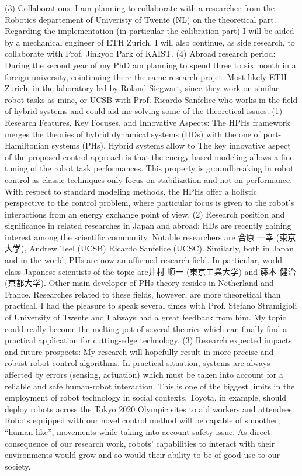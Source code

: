 (3) Collaborations: 
I am planning to collaborate with a researcher from the Robotics departement of Univeristy of Twente (NL) on the theoretical part. Regarding the implementation (in particular the calibration part) I will be aided by a mechanical engineer of ETH Zurich. I will also continue, as side research, to collaborate with Prof. Jinkyoo Park of KAIST.
(4) Abroad research period: 
During the second year of my PhD am planning to spend three to six month in a foreign university, cointinuing there the same research projet. Most likely ETH Zurich, in the laboratory led by Roland Siegwart, since they work on similar robot tasks as mine, or UCSB with Prof. Ricardo Sanfelice who works in the field of hybrid systems and could aid me solving some of the theoretical issues.
(1) Research Features, Key Focuses, and Innovative Aspects: The HPHs framework merges the theories of hybrid dynamical systems (HDs) with the one of port-Hamiltonian systems (PHs). Hybrid systems allow to The key innovative aspect of the proposed control approach is that the energy-based modeling allows a fine tuning of the robot task performances. This property is groundbreaking in robot control as classic techniques only focus on stabilization and not on performance. With respect to standard modeling methods, the HPHs offer a holistic perspective to the control problem, where particular focus is given to the robot’s interactions from an energy exchange point of view. 
(2) Research position and significance in related researches in Japan and abroad: HDs are recently gaining interest among the scientific community. Notable researchers are 合原 一幸 (東京大学), Andrew Teel (UCSB) Ricardo Sanfelice (UCSC). Similarly, both in Japan and in the world, PHs are now an affirmed research field. In particular, world-class Japanese scientists of the topic are井村 順一 (東京工業大学) and 藤本 健治 (京都大学). Other main developer of PHs theory resides in Netherland and France. Researches related to these fields, however, are more theoretical than practical. I had the pleasure to speak several times with Prof. Stefano Stramigioli of University of Twente and I always had a great feedback from him. My topic could really become the melting pot of several theories which can finally find a practical application for cutting-edge technology.
(3) Research expected impacts and future prospects: My research will hopefully result in more precise and robust robot control algorithms. In practical situation, systems are always affected by errors (sensing, actuation) which must be taken into account for a reliable and safe human-robot interaction. This is one of the biggest limits in the employment of robot technology in social contexts. Toyota, in example, should deploy robots across the Tokyo 2020 Olympic sites to aid workers and attendees. Robots equipped with our novel control method will be capable of smoother, “human-like”, movements while taking into account safety issue. As direct consequence of our research work, robots’ capabilities to interact with their environments would grow and so would their ability to be of good use to our society.


